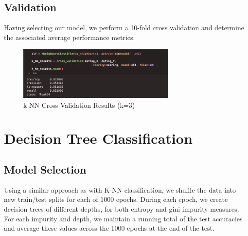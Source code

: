 \documentclass{article}
\begin{document}
    \subsection*{Validation}

    Having selecting our model, we perform a 10-fold cross validation and determine the associated average performance
    metrics.

    \begin{figure}[H]
        \centering
        \includegraphics[width=0.7\textwidth, height=0.17\textheight]{k-NN_validation.png}
        \caption{\small{k-NN Cross Validation Results (k=3)}}
    \end{figure}

\section*{Decision Tree Classification}

    \subsection*{Model Selection}

    Using a similar approach as with K-NN classification, we shuffle the data into
    new train/test splits for each of 1000 epochs. During each epoch, we create 
    decision trees of different depths, for both entropy and gini impurity measures.
    For each impurity and depth, we maintain a running total of the test accuracies
    and average these values across the 1000 epochs at the end of the test. 
\end{document}
